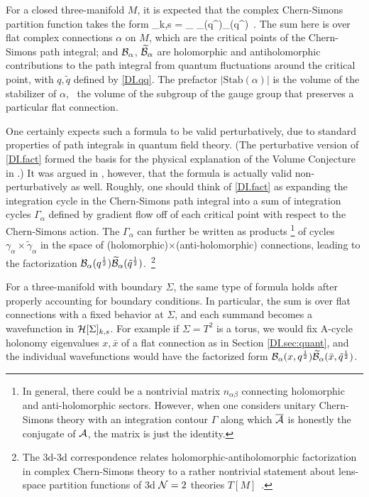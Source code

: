 \documentclass[12pt]{article}
\begin{document}
For a closed three-manifold $M$, it is expected that the complex Chern-Simons partition function takes the form
%
\DIbe \CalZ[M]_{k,s} = \sum_{}  \CalB_\alpha(q^{})\widetilde\CalB_\alpha(\tilde q^{}) \,. \label{DI.fact} \DIee
%
The sum here is over flat complex connections $\alpha$ on $M$, which are the critical points of the Chern-Simons path integral; and $\mathcal{B}_\alpha$, $\widetilde{\mathcal{B}}_\alpha$ are holomorphic and antiholomorphic contributions to the path integral from quantum fluctuations around the critical point, with $q,\tilde q$ defined by \eqref{DI.qq}. The prefactor $|\text{Stab}(\alpha)|$ is the volume of the stabilizer of $\alpha$, \DIie\ the volume of the subgroup of the gauge group that preserves a particular flat connection.


One certainly expects such a formula to be valid perturbatively, due to standard properties of path integrals in quantum field theory. (The perturbative version of \eqref{DI.fact} formed the basis for the physical explanation of the Volume Conjecture in \cite{DIgukov-2003}.) It was argued in \cite{DIWit-anal}, however, that the formula is actually valid non-perturbatively as well. Roughly, one should think of \eqref{DI.fact} as expanding the integration cycle in the Chern-Simons path integral into a sum of integration cycles $\Gamma_\alpha$ defined by gradient flow off of each critical point with respect to the Chern-Simons action. The $\Gamma_\alpha$ can further be written as products%
%
\footnote{In general, there could be a nontrivial matrix $n_{\alpha\beta}$ connecting holomorphic and anti-holomorphic sectors. However, when one considers unitary Chern-Simons theory with an integration contour $\Gamma$ along which $\overline{\mathcal{A}}$ is honestly the conjugate of $\mathcal{A}$, the matrix is just the identity.} %
%
of cycles $\gamma_\alpha\times \widetilde\gamma_\alpha$ in the space of (holomorphic)$\times$(anti-holomorphic) connections, leading to the factorization $\mathcal{B}_\alpha(q^{\frac12})\widetilde{\mathcal{B}}_\alpha(\tilde q^{\frac12})$.\,%
%
\footnote{The 3d-3d correspondence relates holomorphic-antiholomorphic factorization in complex Chern-Simons theory to a rather nontrivial statement about lens-space partition functions of 3d $\mathcal{N}=2$ theories $T[M]$~\cite{DIBDP-blocks}.}

For a three-manifold with boundary $\Sigma$, the same type of formula holds after properly accounting for boundary conditions. In particular, the sum is over flat connections with a fixed behavior at $\Sigma$, and each summand becomes a wavefunction  in $\mathcal{H}[\Sigma]_{k,s}$. For example if $\Sigma=T^2$ is a torus, we would fix A-cycle holonomy eigenvalues $x,\bar x$ of a flat connection as in Section \ref{DI.sec:quant}, and the individual wavefunctions would have the factorized form $\mathcal{B}_\alpha(x,q^{\frac12})\widetilde{\mathcal{B}}_\alpha(\bar x,\tilde q^{\frac12})$.
\end{document}
